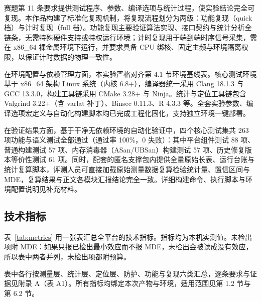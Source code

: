 赛题第 11 条要求提供测试程序、参数、编译选项与统计过程，使实验结论完全可复现。本作品构建了标准化复现机制，将复现流程划分为两级：功能复现（quick 档）与计时复现（full 档）。功能复现主要验证算法实现、接口契约与统计分析全链条，无需特殊硬件支持或特权运行环境；计时复现用于端到端时序信号采集，需在 x86\_64 裸金属环境下运行，并要求具备 CPU 绑核、固定主频与环境隔离权限，以保证计时数据的物理一致性。

在环境配置与依赖管理方面，本实验严格对齐第 4.1 节环境基线表。核心测试环境基于 x86\_64 架构 Linux 系统（内核 6.8+），编译器统一采用 Clang 18.1.3 与 GCC 13.3.0，构建工具链采用 CMake 3.28+ 与 Ninja。统计与定位工具链包含 Valgrind 3.22+（含 varlat 补丁）、Binsec 0.11.3、R 4.3.3 等。全套实验参数、编译选项宏定义与自动化构建脚本均已完成工程化固化，支持独立环境一键部署。

在验证结果方面，基于干净无依赖环境的自动化验证中，四个核心测试集共 263 项功能与语义测试全部通过（通过率 100\%，0 失败）：其中平台组件测试 88 项、普通构建测试 57 项、内存消毒器（ASan/UBSan）构建测试 57 项、历史修复版本等价性测试 61 项。同时，配套的匿名支撑包内提供全量原始长表、运行台账与统计复算脚本，评测人员可直接加载原始测量数据复算检验统计量、置信区间与 MDE，复算结果与正文各模块汇报结论完全一致。详细构建命令、执行脚本与环境配置说明见补充材料。

\subsection{技术指标}

表~\ref{tab:metrics} 用一张表汇总全平台的技术指标。指标均为本机实测值。未检出项附 MDE：如果只报已检出最小效应而不报 MDE，未检出会被读成没有效应，所以表中两者并列，未检出项都附预算。

表中各行按测量层、统计层、定位层、防护、功能与复现六类汇总，逐条要求与证据见附录 A（表 A1）。所有指标均绑定本次产物与环境，适用范围见第 1.2 节与第 6.2 节。


